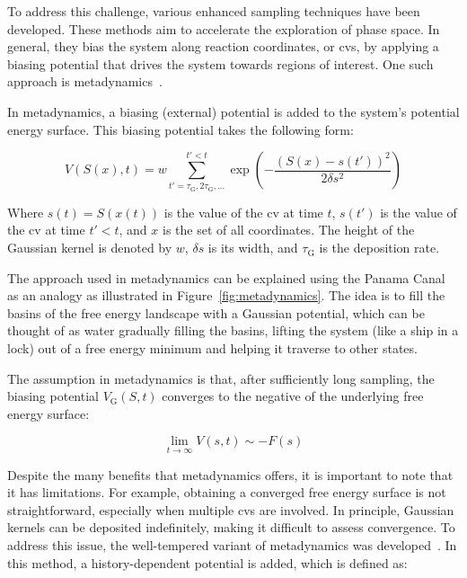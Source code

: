 To address this challenge, various enhanced sampling techniques have been developed. These methods aim to accelerate the exploration of phase space. In general, they bias the system along reaction coordinates, or \acp{cv}, by applying a biasing potential that drives the system towards regions of interest. One such approach is metadynamics~\citep{laioEscapingFreeenergyMinima2002, laioMetadynamicsMethodSimulate2008}.

In metadynamics, a biasing (external) potential is added to the system's potential energy surface. This biasing potential takes the following form:

\begin{equation}
    V(S(x), t) = w \sum_{t' = \tau_{\text{G}}, 2\tau_{\text{G}}, \ldots}^{t' < t} \exp\left(-\frac{(S(x) - s(t'))^2}{2\delta s^2}\right)
    \label{eq:biasing_potential}
\end{equation}

Where $s(t) = S(x(t))$ is the value of the \ac{cv} at time $t$, $s(t')$ is the value of the \ac{cv} at time $t' < t$, and $x$ is the set of all coordinates. The height of the Gaussian kernel is denoted by $w$, $\delta s$ is its width, and $\tau_{\text{G}}$ is the deposition rate.

The approach used in metadynamics can be explained using the Panama Canal as an analogy as illustrated in Figure~\ref{fig:metadynamics}. The idea is to fill the basins of the free energy landscape with a Gaussian potential, which can be thought of as water gradually filling the basins, lifting the system (like a ship in a lock) out of a free energy minimum and helping it traverse to other states.

The assumption in metadynamics is that, after sufficiently long sampling, the biasing potential $V_{\text{G}}(S, t)$ converges to the negative of the underlying free energy surface:

\begin{equation}
    \label{eq:free_energy_from_metadynamics}
    \lim_{t \to \infty} V(s,t) \sim -F(s)
\end{equation}

Despite the many benefits that metadynamics offers, it is important to note that it has limitations. For example, obtaining a converged free energy surface is not straightforward, especially when multiple \acp{cv} are involved. In principle, Gaussian kernels can be deposited indefinitely, making it difficult to assess convergence. To address this issue, the well-tempered variant of metadynamics was developed~\citep{barducciWellTemperedMetadynamicsSmoothly2008}. In this method, a history-dependent potential is added, which is defined as:

